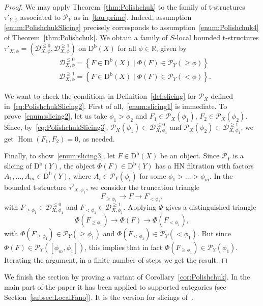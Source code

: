 \documentclass[11pt, reqno]{amsart}
\numberwithin{equation}{section}
\theoremstyle{plain}
\theoremstyle{remark}
\theoremstyle{definition}
\theoremstyle{italicsname}
\newcommand{\st}{\mid}
\newcommand{\Db}{\mathrm{D^b}}
\DeclareMathOperator{\Hom}{Hom}
\newcommand{\cD}{\mathscr{D}}
\newcommand{\cP}{\mathscr{P}}
\def\RR{\ensuremath{\mathbb{R}}}
\begin{document}
\begin{proof}
We may apply Theorem~\ref{thm:Polishchuk} to the family of t-structures $\tau'_{Y,\phi}$ associated to $\cP_Y$ as in~\eqref{tau-prime}.
Indeed, assumption \ref{enum:PolishchukSlicing} precisely corresponds to assumption~\ref{enum:Polishchuk4} of Theorem~\ref{thm:Polishchuk}.  
We obtain a family of $S$-local bounded t-structures $\tau'_{X,\phi} = (\cD_{X,\phi}^{\leq 0}, \cD_{X,\phi}^{\geq 1})$ on $\Db(X)$ for all $\phi\in\RR$, given by
\begin{equation}\label{eq:PolishchukSlicing3}
\begin{split}
&\cD_{X,\phi}^{\leqslant0}=\left\{F\in\Db(X)\st \Phi(F)\in\cP_{Y}(\geq\phi)\right\}\\
&\cD_{X,\phi}^{\geqslant1}=\left\{F\in\Db(X)\st \Phi(F)\in\cP_{Y}(<\phi)\right\}.  
\end{split}
\end{equation}

We want to check the conditions in Definition~\ref{def:slicing} for $\cP_X$ defined in~\eqref{eq:PolishchukSlicing2}.
First of all,~\ref{enum:slicing1} is immediate.
To prove~\ref{enum:slicing2}, let us take $\phi_1>\phi_2$ and $F_1\in\cP_X(\phi_1)$, $F_2\in\cP_X(\phi_2)$.
Since, by~\eqref{eq:PolishchukSlicing3}, $\cP_X(\phi_1)\subset\cD_{X,\phi_1}^{\leqslant0}$ and $\cP_X(\phi_2)\subset\cD_{X,\phi_1}^{\geqslant1}$, we get $\Hom(F_1,F_2)=0$, as needed. 

Finally, to show~\ref{enum:slicing3}, let $F\in\Db(X)$ be an object.
Since $\cP_Y$ is a slicing of $\Db(Y)$, the object $\Phi(F) \in \Db(Y)$ has a HN filtration with factors $A_1,\dots,A_m\in\Db(Y)$, where $A_i\in\cP_Y(\phi_i)$ for some $\phi_1>\dots>\phi_m$. 
In the bounded t-structure $\tau'_{X,\phi_1}$, we consider the truncation triangle 
\[
F_{\geq\phi_1}\longrightarrow F\longrightarrow F_{<\phi_1},
\]
with $F_{\geq\phi_1}\in\cD_{X,\phi_1}^{\leqslant0}$ and $F_{<\phi_1}\in\cD_{X,\phi_1}^{\geqslant1}$.
Applying $\Phi$ gives a distinguished triangle 
\[
\Phi(F_{\geq\phi_1})\longrightarrow\Phi(F)\longrightarrow\Phi(F_{<\phi_1}),
\]
with $\Phi(F_{\geq\phi_1})\in\cP_Y(\geq\phi_1)$ and $\Phi(F_{<\phi_1})\in\cP_Y(<\phi_1)$. 
But since $\Phi(F)\in\cP_Y([\phi_m,\phi_1])$, this implies that in fact $\Phi(F_{\geq \phi_1}) \in \cP_Y(\phi_1)$.
Iterating the argument, in a finite number of steps we get the result.
\end{proof}

We finish the section by proving a variant of Corollary~\ref{cor:Polishchuk}.
In the main part of the paper it has been applied to supported categories (see Section~\ref{subsec:LocalFano}). 
It is the version for slicings of~\cite[Lemma 2.11]{MMS:Inducing}.
\end{document}
